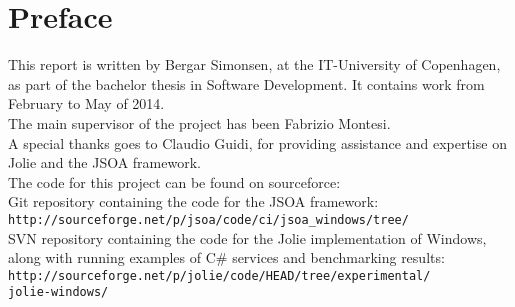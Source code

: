 \documentclass[12pt,a4paper]{article}
\author{Bergar Simonsen}
\begin{document}
\section*{Preface}
This report is written by Bergar Simonsen, at the IT-University of Copenhagen, as part of the bachelor thesis in Software Development. It contains work from February to May of 2014. \\

The main supervisor of the project has been Fabrizio Montesi.\\
A special thanks goes to Claudio Guidi, for providing assistance and expertise on Jolie and the JSOA framework.\\

The code for this project can be found on sourceforce:\\

Git repository containing the code for the JSOA framework:\\
\texttt{http://sourceforge.net/p/jsoa/code/ci/jsoa\_windows/tree/}\\

SVN repository containing the code for the Jolie implementation of Windows, along with running examples of C\# services and benchmarking results:\\
\texttt{http://sourceforge.net/p/jolie/code/HEAD/tree/experimental/\\
jolie-windows/}
\end{document}
